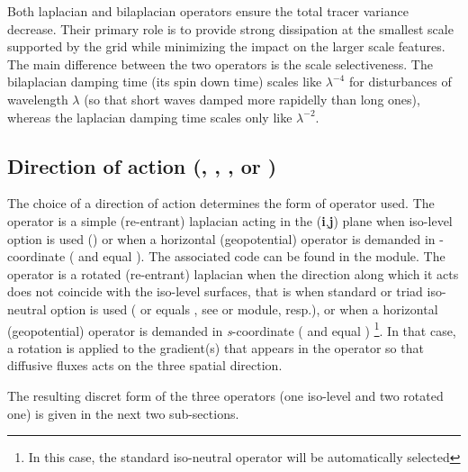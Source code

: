 \documentclass[../main/NEMO_manual]{subfiles}
\begin{document}
Both laplacian and bilaplacian operators ensure the total tracer variance decrease.
Their primary role is to provide strong dissipation at the smallest scale supported by the grid while
minimizing the impact on the larger scale features.
The main difference between the two operators is the scale selectiveness.
The bilaplacian damping time (\ie its spin down time) scales like $\lambda^{-4}$ for
disturbances of wavelength $\lambda$ (so that short waves damped more rapidelly than long ones),
whereas the laplacian damping time scales only like $\lambda^{-2}$.


\subsection[Action direction (\protect\np{ln\_traldf}\{\_lev,\_hor,\_iso,\_triad\})]
			     {Direction of action (\protect{}, \protect{}, \protect{}, or \protect{}) } 
\label{subsec:TRA_ldf_dir}

The choice of a direction of action determines the form of operator used.
The operator is a simple (re-entrant) laplacian acting in the (\textbf{i},\textbf{j}) plane when
iso-level option is used () or
when a horizontal (\ie geopotential) operator is demanded in \zstar-coordinate
( and  equal ).
The associated code can be found in the  module.
The operator is a rotated (re-entrant) laplacian when
the direction along which it acts does not coincide with the iso-level surfaces,
that is when standard or triad iso-neutral option is used
( or  equals ,
see  or  module, resp.), or
when a horizontal (\ie geopotential) operator is demanded in \textit{s}-coordinate
( and  equal )
\footnote{In this case, the standard iso-neutral operator will be automatically selected}.
In that case, a rotation is applied to the gradient(s) that appears in the operator so that
diffusive fluxes acts on the three spatial direction.

The resulting discret form of the three operators (one iso-level and two rotated one) is given in
the next two sub-sections. 
\end{document}
